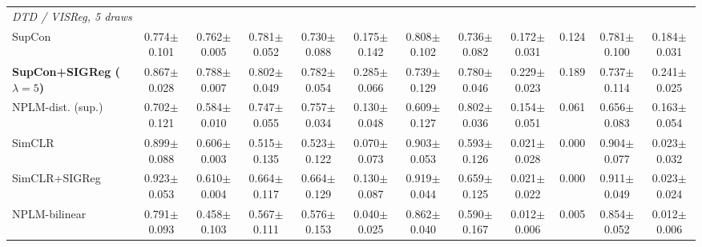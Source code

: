 \begin{landscape}
\begin{center}
\begin{longtable}{lccccccccccc}
\multicolumn{12}{l}{\emph{DTD / VISReg, 5 draws}} \\
\quad SupCon & 0.774$\pm$0.101 & 0.762$\pm$0.005 & 0.781$\pm$0.052 & 0.730$\pm$0.088 & 0.175$\pm$0.142 & 0.808$\pm$0.102 & 0.736$\pm$0.082 & 0.172$\pm$0.031 & 0.124 & 0.781$\pm$0.100 & 0.184$\pm$0.031 \\
\quad \textbf{SupCon+SIGReg ($\lambda{=}5$)} & 0.867$\pm$0.028 & 0.788$\pm$0.007 & 0.802$\pm$0.049 & 0.782$\pm$0.054 & 0.285$\pm$0.066 & 0.739$\pm$0.129 & 0.780$\pm$0.046 & 0.229$\pm$0.023 & 0.189 & 0.737$\pm$0.114 & 0.241$\pm$0.025 \\
\quad NPLM-dist. (sup.) & 0.702$\pm$0.121 & 0.584$\pm$0.010 & 0.747$\pm$0.055 & 0.757$\pm$0.034 & 0.130$\pm$0.048 & 0.609$\pm$0.127 & 0.802$\pm$0.036 & 0.154$\pm$0.051 & 0.061 & 0.656$\pm$0.083 & 0.163$\pm$0.054 \\
\quad SimCLR & 0.899$\pm$0.088 & 0.606$\pm$0.003 & 0.515$\pm$0.135 & 0.523$\pm$0.122 & 0.070$\pm$0.073 & 0.903$\pm$0.053 & 0.593$\pm$0.126 & 0.021$\pm$0.028 & 0.000 & 0.904$\pm$0.077 & 0.023$\pm$0.032 \\
\quad SimCLR+SIGReg & 0.923$\pm$0.053 & 0.610$\pm$0.004 & 0.664$\pm$0.117 & 0.664$\pm$0.129 & 0.130$\pm$0.087 & 0.919$\pm$0.044 & 0.659$\pm$0.125 & 0.021$\pm$0.022 & 0.000 & 0.911$\pm$0.049 & 0.023$\pm$0.024 \\
\quad NPLM-bilinear & 0.791$\pm$0.093 & 0.458$\pm$0.103 & 0.567$\pm$0.111 & 0.576$\pm$0.153 & 0.040$\pm$0.025 & 0.862$\pm$0.040 & 0.590$\pm$0.167 & 0.012$\pm$0.006 & 0.005 & 0.854$\pm$0.052 & 0.012$\pm$0.006 \\
\end{longtable}
\end{center}
\end{landscape}
